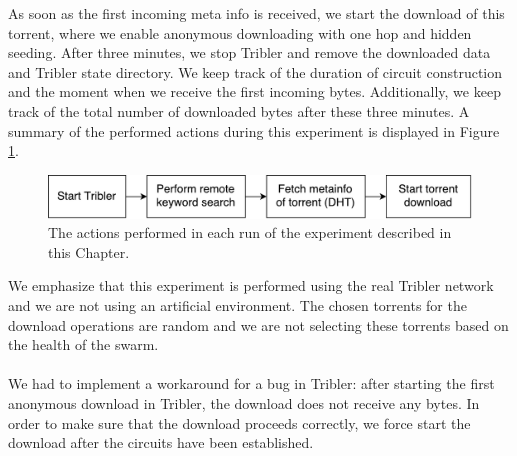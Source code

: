 As soon as the first incoming meta info is received, we start the download of this torrent, where we enable anonymous downloading with one hop and hidden seeding. After three minutes, we stop Tribler and remove the downloaded data and Tribler state directory. We keep track of the duration of circuit construction and the moment when we receive the first incoming bytes. Additionally, we keep track of the total number of downloaded bytes after these three minutes. A summary of the performed actions during this experiment is displayed in Figure \ref{fig:big-experiment-setup}.\\

\begin{figure}[!h]
	\centering
	\includegraphics[width=0.7\columnwidth]{images/big_experiment/big_experiment_setup}
	\caption{The actions performed in each run of the experiment described in this Chapter.}
	\label{fig:big-experiment-setup}
\end{figure}

We emphasize that this experiment is performed using the real Tribler network and we are not using an artificial environment. The chosen torrents for the  download operations are random and we are not selecting these torrents based on the health of the swarm.\\\\
We had to implement a workaround for a bug in Tribler: after starting the first anonymous download in Tribler, the download does not receive any bytes. In order to make sure that the download proceeds correctly, we force start the download after the circuits have been established.

